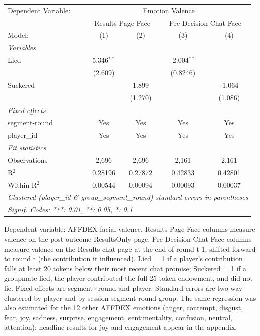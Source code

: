 
\begingroup
\centering
\begin{tabular}{lcccc}
   \tabularnewline \midrule \midrule
   Dependent Variable: & \multicolumn{4}{c}{Emotion Valence}\\
    & \multicolumn{2}{c}{Results Page Face} & \multicolumn{2}{c}{Pre-Decision Chat Face} \\ 
   Model:        & (1)          & (2)     & (3)           & (4)\\  
   \midrule
   \emph{Variables}\\
   Lied          & 5.346$^{**}$ &         & -2.004$^{**}$ &   \\   
                 & (2.609)      &         & (0.8246)      &   \\   
   Suckered      &              & 1.899   &               & -1.064\\   
                 &              & (1.270) &               & (1.086)\\   
   \midrule
   \emph{Fixed-effects}\\
   segment-round & Yes          & Yes     & Yes           & Yes\\  
   player\_id    & Yes          & Yes     & Yes           & Yes\\  
   \midrule
   \emph{Fit statistics}\\
   Observations  & 2,696        & 2,696   & 2,161         & 2,161\\  
   R$^2$         & 0.28196      & 0.27872 & 0.42833       & 0.42801\\  
   Within R$^2$  & 0.00544      & 0.00094 & 0.00093       & 0.00037\\  
   \midrule \midrule
   \multicolumn{5}{l}{\emph{Clustered (player\_id \& group\_segment\_round) standard-errors in parentheses}}\\
   \multicolumn{5}{l}{\emph{Signif. Codes: ***: 0.01, **: 0.05, *: 0.1}}\\
\end{tabular}
 
\par \raggedright 
Dependent variable: AFFDEX facial valence. Results Page Face columns measure valence on the post-outcome ResultsOnly page. Pre-Decision Chat Face columns measure valence on the Results chat page at the end of round t-1, shifted forward to round t (the contribution it influenced). Lied = 1 if a player's contribution falls at least 20 tokens below their most recent chat promise; Suckered = 1 if a groupmate lied, the player contributed the full 25-token endowment, and did not lie. Fixed effects are segment$\times$round and player. Standard errors are two-way clustered by player and by session-segment-round-group. The same regression was also estimated for the 12 other AFFDEX emotions (anger, contempt, disgust, fear, joy, sadness, surprise, engagement, sentimentality, confusion, neutral, attention); headline results for joy and engagement appear in the appendix.
\par\endgroup


